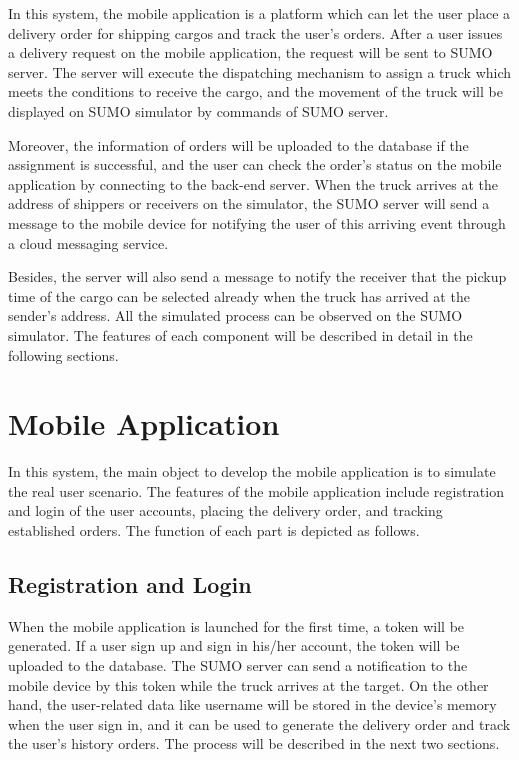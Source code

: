 \documentclass[12pt]{ksthesis}
\begin{document}
\begin{thesis}
{In this system, the mobile application is a platform which can let the user place a delivery order for shipping cargos and track the user’s orders. After a user issues a delivery request on the mobile application, the request will be sent to SUMO server. The server will execute the dispatching mechanism to assign a truck which meets the conditions to receive the cargo, and the movement of the truck will be displayed on SUMO simulator by commands of SUMO server. 

Moreover, the information of orders will be uploaded to the database if the assignment is successful, and the user can check the order’s status on the mobile application by connecting to the back-end server. When the truck arrives at the address of shippers or receivers on the simulator, the SUMO server will send a message to the mobile device for notifying the user of this arriving event through a cloud messaging service. 

Besides, the server will also send a message to notify the receiver that the pickup time of the cargo can be selected already when the truck has arrived at the sender’s address. All the simulated process can be observed on the SUMO simulator. The features of each component will be described in detail in the following sections.

\section{Mobile Application}
In this system, the main object to develop the mobile application is to simulate the real user scenario. The features of the mobile application include registration and login of the user accounts, placing the delivery order, and tracking established orders. The function of each part is depicted as follows.

\subsection{Registration and Login}
When the mobile application is launched for the first time, a token will be generated. If a user sign up and sign in his/her account, the token will be uploaded to the database. The SUMO server can send a notification to the mobile device by this token while the truck arrives at the target. On the other hand, the user-related data like username will be stored in the device’s memory when the user sign in, and it can be used to generate the delivery order and track the user’s history orders. The process will be described in the next two sections.

}
\end{thesis}
\end{document}
